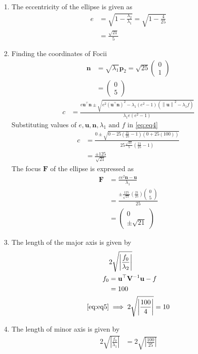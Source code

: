 \documentclass[12pt]{article}
\providecommand{\brak}[1]{\ensuremath{\left(#1\right)}}
\providecommand{\norm}[1]{\left\lVert#1\right\rVert}
\providecommand{\abs}[1]{\left\vert#1\right\vert}
\newcommand{\myvec}[1]{\ensuremath{\begin{pmatrix}#1\end{pmatrix}}}
\let\vec\mathbf
\begin{document}
\begin{enumerate}
\item The eccentricity of the ellipse is given as
\begin{align}
	e &= \sqrt{1 - \frac{\lambda_2}{\lambda_1}} = \sqrt{1-\frac{4}{25}}\\
	  &= \frac{\sqrt{21}}{5}
\end{align}
\item Finding the coordinates of Focii
\begin{align}
	\vec{n} &= \sqrt{\lambda_1}\vec{p}_2= \sqrt{25} \myvec{0\\1}\\
	&= \myvec{0\\5}
\end{align}
\begin{align}
	\label{eq:eq4}
	c &= \frac{e\vec{u}^\top \vec{n} \pm \sqrt{e^2 \brak{\vec{u}^\top \vec{n}}^2-\lambda_1 \brak{e^2 -1}\brak{\norm{\vec{u}}^2-\lambda_1 f}}}{\lambda_1 e\brak{e^2-1}}
\end{align}
Substituting values of $e,\vec{u},\vec{n},\lambda_1 \text{ and } f$ in \eqref{eq:eq4}
\begin{align}
	c &= \frac{0 \pm \sqrt{0-25\brak{\frac{21}{25}-1}\brak{0+25\brak{100}}}}{25\frac{\sqrt{21}}{5}\brak{\frac{21}{25}-1}}\\
	&= \frac{\pm 125}{\sqrt{21}}
\end{align}
The focus $\vec{F}$ of the ellipse is expressed as
\begin{align}
	\vec{F} &= \frac{ce^2 \vec{n}-\vec{u}}{\lambda_1}\\
	&= \frac{\pm \frac{125}{\sqrt{21}}\brak{\frac{21}{25}}\myvec{0\\5}}{25}\\
	&= \myvec{0\\\pm \sqrt{21}}
\end{align}
\item The length of the major axis is given by
\begin{align}
	\label{eq:eq5}
	&2\sqrt{\abs{\frac{f_0}{\lambda_2}}}\\
	f_0 &= \vec{u}^\top \vec{V}^{-1} \vec{u} -f\\
	    &= 100\\
	\eqref{eq:eq5} &\implies 2\sqrt{\abs{\frac{100}{4}}}
	 = 10
\end{align}
\item The length of minor axis is given by
\begin{align}
	2\sqrt{\abs{\frac{f_0}{\lambda_1}}}&= 2\sqrt{\abs{\frac{100}{25}}}\\

\end{align}
\end{enumerate}
\end{document}
